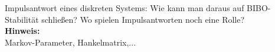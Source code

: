 \begin{question}[section=7,name={Impulsantwort},difficulty=,type=mdl,tags={}]
	Impulsantwort eines diskreten Systems: Wie kann man daraus auf BIBO-Stabilität schließen? Wo spielen Impulsantworten noch eine Rolle?
	\\ \textbf{Hinweis:}\\
	Markov-Parameter, Hankelmatrix,...
\end{question}
\begin{solution}
	
\end{solution}